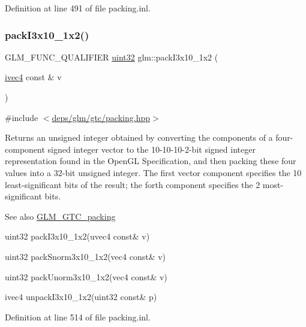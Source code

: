 Definition at line 491 of file packing.\+inl.

\mbox{\label{group__gtc__packing_ga032e18fa5bc5b8f3897104aeb2f1e195}} 
\subsubsection{\texorpdfstring{pack\+I3x10\+\_\+1x2()}{packI3x10\_1x2()}}
{\footnotesize\ttfamily G\+L\+M\+\_\+\+F\+U\+N\+C\+\_\+\+Q\+U\+A\+L\+I\+F\+I\+ER \hyperlink{group__gtc__type__precision_ga202b6a53c105fcb7e531f9b443518451}{uint32} glm\+::pack\+I3x10\+\_\+1x2 (\begin{DoxyParamCaption}\item[{\hyperlink{group__core__types_gaa4560ddc50320ea8f8a70d5c9c249fea}{ivec4} const \&}]{v }\end{DoxyParamCaption})}



{\ttfamily \#include $<$\hyperlink{gtc_2packing_8hpp}{deps/glm/gtc/packing.\+hpp}$>$}

Returns an unsigned integer obtained by converting the components of a four-\/component signed integer vector to the 10-\/10-\/10-\/2-\/bit signed integer representation found in the Open\+GL Specification, and then packing these four values into a 32-\/bit unsigned integer. The first vector component specifies the 10 least-\/significant bits of the result; the forth component specifies the 2 most-\/significant bits.

\begin{DoxySeeAlso}{See also}
\hyperlink{group__gtc__packing}{G\+L\+M\+\_\+\+G\+T\+C\+\_\+packing} 

uint32 pack\+I3x10\+\_\+1x2(uvec4 const\& v) 

uint32 pack\+Snorm3x10\+\_\+1x2(vec4 const\& v) 

uint32 pack\+Unorm3x10\+\_\+1x2(vec4 const\& v) 

ivec4 unpack\+I3x10\+\_\+1x2(uint32 const\& p) 
\end{DoxySeeAlso}


Definition at line 514 of file packing.\+inl.

\mbox{\label{group__gtc__packing_ga0182984c14b2b59fd74e72af3f3b4bb9}} 
